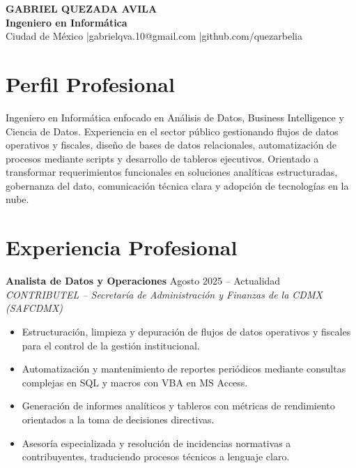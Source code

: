 \documentclass[10pt,letterpaper]{article}
\begin{document}
\begin{center}
    {\Large\bfseries\color{headerblue} GABRIEL QUEZADA AVILA}\\[2pt]
    {\normalsize\bfseries\color{accent} Ingeniero en Informática}\\[2pt]
    {\footnotesize\color{graytext}
    Ciudad de México \quad|\quad gabrielqva.10@gmail.com \quad|\quad github.com/quezarbelia
    }
\end{center}

\vspace{-6pt}

\section{Perfil Profesional}
Ingeniero en Informática enfocado en Análisis de Datos, Business Intelligence y Ciencia de Datos. Experiencia en el sector público gestionando flujos de datos operativos y fiscales, diseño de bases de datos relacionales, automatización de procesos mediante scripts y desarrollo de tableros ejecutivos. Orientado a transformar requerimientos funcionales en soluciones analíticas estructuradas, gobernanza del dato, comunicación técnica clara y adopción de tecnologías en la nube.

\section{Experiencia Profesional}

\textbf{Analista de Datos y Operaciones} \hfill Agosto 2025 -- Actualidad\\
\textit{CONTRIBUTEL -- Secretaría de Administración y Finanzas de la CDMX (SAFCDMX)}
\begin{itemize}[leftmargin=12pt, itemsep=0pt, topsep=1pt, parsep=0pt]
    \item Estructuración, limpieza y depuración de flujos de datos operativos y fiscales para el control de la gestión institucional.
    \item Automatización y mantenimiento de reportes periódicos mediante consultas complejas en SQL y macros con VBA en MS Access.
    \item Generación de informes analíticos y tableros con métricas de rendimiento orientados a la toma de decisiones directivas.
    \item Asesoría especializada y resolución de incidencias normativas a contribuyentes, traduciendo procesos técnicos a lenguaje claro.
\end{itemize}
\end{document}
